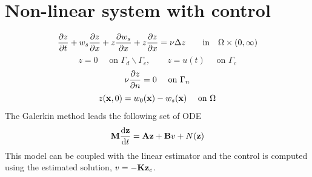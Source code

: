 \documentclass[12pt]{article}
\begin{document}
\section{Non-linear system with control}
\begin{equation*}
\frac{\partial z}{\partial t} + w_s \frac{\partial z}{\partial x} + z \frac{\partial w_s}{\partial x} + z \frac{\partial z}{\partial x} = \nu \Delta z \qquad \mbox{in} \quad \Omega \times (0,\infty)
\end{equation*}
\begin{equation*}
z = 0 \quad \text{ on } \Gamma_d \backslash \Gamma_c, \qquad z = u(t) \quad \text{ on } \Gamma_c
\end{equation*}
\begin{equation*}
\nu \frac{\partial z}{\partial n} = 0 \quad \text{ on } \Gamma_n 
\end{equation*}
\begin{equation*}
z({\mathbf x},0) = w_0({\mathbf x}) - w_s({\mathbf x}) \quad \text{ on } \Omega
\end{equation*}
The Galerkin method leads the following set of ODE
\[
{\mathbf M} \frac{\textrm{d} {\mathbf z}}{\textrm{d} t} = {\mathbf A} {\mathbf z} + {\mathbf B} v + N({\mathbf z})
\]
This model can be coupled with the linear estimator and the control is computed using the estimated solution, $v = -{\mathbf K} {\mathbf z}_e$.









\end{document}
